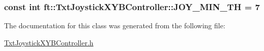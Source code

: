 \subsubsection[{\texorpdfstring{J\+O\+Y\+\_\+\+M\+I\+N\+\_\+\+TH}{JOY_MIN_TH}}]{\setlength{\rightskip}{0pt plus 5cm}const int ft\+::\+Txt\+Joystick\+X\+Y\+B\+Controller\+::\+J\+O\+Y\+\_\+\+M\+I\+N\+\_\+\+TH = 7}\hypertarget{classft_1_1_txt_joystick_x_y_b_controller_aed636918b23f3952bb7c7ee89d86f689}{}\label{classft_1_1_txt_joystick_x_y_b_controller_aed636918b23f3952bb7c7ee89d86f689}


The documentation for this class was generated from the following file\+:\begin{DoxyCompactItemize}
\item 
\hyperlink{_txt_joystick_x_y_b_controller_8h}{Txt\+Joystick\+X\+Y\+B\+Controller.\+h}\end{DoxyCompactItemize}

